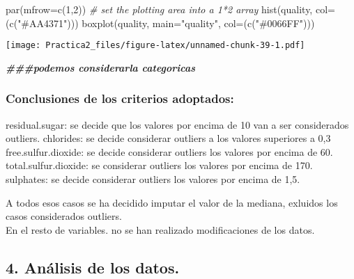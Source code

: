 \documentclass[
]{article}
\newenvironment{Shaded}{\begin{snugshade}}{\end{snugshade}}
\newcommand{\AttributeTok}[1]{\textcolor[rgb]{0.77,0.63,0.00}{#1}}
\newcommand{\CommentTok}[1]{\textcolor[rgb]{0.56,0.35,0.01}{\textit{#1}}}
\newcommand{\DecValTok}[1]{\textcolor[rgb]{0.00,0.00,0.81}{#1}}
\newcommand{\DocumentationTok}[1]{\textcolor[rgb]{0.56,0.35,0.01}{\textbf{\textit{#1}}}}
\newcommand{\FunctionTok}[1]{\textcolor[rgb]{0.00,0.00,0.00}{#1}}
\newcommand{\NormalTok}[1]{#1}
\newcommand{\StringTok}[1]{\textcolor[rgb]{0.31,0.60,0.02}{#1}}
\begin{document}
\begin{Shaded}
\begin{Highlighting}[]
\FunctionTok{par}\NormalTok{(}\AttributeTok{mfrow=}\FunctionTok{c}\NormalTok{(}\DecValTok{1}\NormalTok{,}\DecValTok{2}\NormalTok{))    }\CommentTok{\# set the plotting area into a 1*2 array}
\FunctionTok{hist}\NormalTok{(quality, }\AttributeTok{col=}\NormalTok{(}\FunctionTok{c}\NormalTok{(}\StringTok{"\#AA4371"}\NormalTok{)))}
\FunctionTok{boxplot}\NormalTok{(quality, }\AttributeTok{main=}\StringTok{"quality"}\NormalTok{, }\AttributeTok{col=}\NormalTok{(}\FunctionTok{c}\NormalTok{(}\StringTok{"\#0066FF"}\NormalTok{)))}
\end{Highlighting}
\end{Shaded}

\texttt{[image: Practica2\_files/figure-latex/unnamed-chunk-39-1.pdf]}

\begin{Shaded}
\begin{Highlighting}[]
\DocumentationTok{\#\#\#podemos considerarla categoricas}
\end{Highlighting}
\end{Shaded}

\hypertarget{conclusiones-de-los-criterios-adoptados}{%
\subsubsection{Conclusiones de los criterios
adoptados:}\label{conclusiones-de-los-criterios-adoptados}}

residual.sugar: se decide que los valores por encima de 10 van a ser
considerados outliers. chlorides: se decide considerar outliers a los
valores superiores a 0,3 free.sulfur.dioxide: se decide considerar
outliers los valores por encima de 60. total.sulfur.dioxide: se
considerar outliers los valores por encima de 170. sulphates: se decide
considerar outliers los valores por encima de 1,5.

A todos esos casos se ha decidido imputar el valor de la mediana,
exluidos los casos considerados outliers.\\
En el resto de variables. no se han realizado modificaciones de los
datos.

\hypertarget{anuxe1lisis-de-los-datos.}{%
\subsection{4. Análisis de los datos.}\label{anuxe1lisis-de-los-datos.}}
\end{document}
